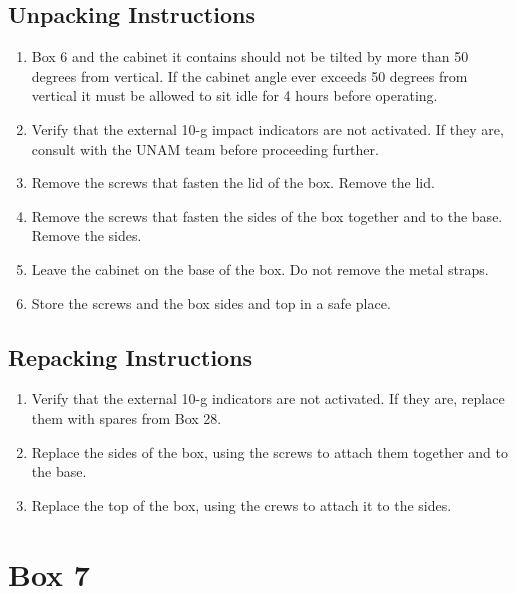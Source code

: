 \documentclass{article}
\begin{document}
\subsection{Unpacking Instructions}

\begin{enumerate}
\item Box 6 and the cabinet it contains should not be tilted by more than 50 degrees from vertical. If the cabinet angle ever exceeds 50 degrees from vertical it must be allowed to sit idle for 4 hours before operating.
\item Verify that the external 10-g impact indicators are not activated. If they are, consult with the UNAM team before proceeding further.
\item Remove the screws that fasten the lid of the box. Remove the lid.
\item Remove the screws that fasten the sides of the box together and to the base. Remove the sides.
\item Leave the cabinet on the base of the box. Do not remove the metal straps.
\item Store the screws and the box sides and top in a safe place.
\end{enumerate}

\subsection{Repacking Instructions}

\begin{enumerate}
\item Verify that the external 10-g indicators are not activated. If they are, replace them with spares from Box 28.
\item Replace the sides of the box, using the screws to attach them together and to the base.
\item Replace the top of the box, using the crews to attach it to the sides.
\end{enumerate}


\clearpage
\section{Box 7}
\end{document}
